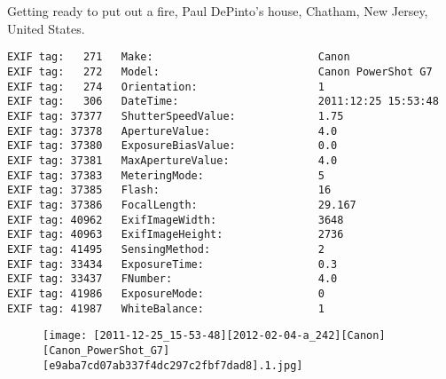 \section{\protect{}}
\noindent Getting ready to put out a fire, Paul DePinto's house, Chatham, New Jersey, United States.
\noindent
\begin{lstlisting}
EXIF tag:   271   Make:                          Canon
EXIF tag:   272   Model:                         Canon PowerShot G7
EXIF tag:   274   Orientation:                   1
EXIF tag:   306   DateTime:                      2011:12:25 15:53:48
EXIF tag: 37377   ShutterSpeedValue:             1.75
EXIF tag: 37378   ApertureValue:                 4.0
EXIF tag: 37380   ExposureBiasValue:             0.0
EXIF tag: 37381   MaxApertureValue:              4.0
EXIF tag: 37383   MeteringMode:                  5
EXIF tag: 37385   Flash:                         16
EXIF tag: 37386   FocalLength:                   29.167
EXIF tag: 40962   ExifImageWidth:                3648
EXIF tag: 40963   ExifImageHeight:               2736
EXIF tag: 41495   SensingMethod:                 2
EXIF tag: 33434   ExposureTime:                  0.3
EXIF tag: 33437   FNumber:                       4.0
EXIF tag: 41986   ExposureMode:                  0
EXIF tag: 41987   WhiteBalance:                  1

\end{lstlisting}
\clearpage
\begin{figure}
\raggedleft
\texttt{[image: [2011-12-25\_15-53-48][2012-02-04-a\_242][Canon][Canon\_PowerShot\_G7][e9aba7cd07ab337f4dc297c2fbf7dad8].1.jpg]}
\end{figure}


\clearpage
